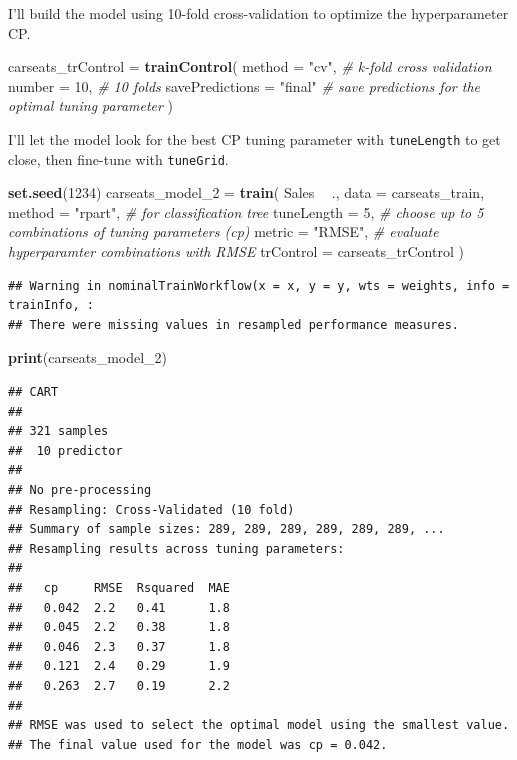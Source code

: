 \documentclass[
]{book}
\newenvironment{Shaded}{\begin{snugshade}}{\end{snugshade}}
\newcommand{\CommentTok}[1]{\textcolor[rgb]{0.56,0.35,0.01}{\textit{#1}}}
\newcommand{\DataTypeTok}[1]{\textcolor[rgb]{0.13,0.29,0.53}{#1}}
\newcommand{\DecValTok}[1]{\textcolor[rgb]{0.00,0.00,0.81}{#1}}
\newcommand{\KeywordTok}[1]{\textcolor[rgb]{0.13,0.29,0.53}{\textbf{#1}}}
\newcommand{\NormalTok}[1]{#1}
\newcommand{\OperatorTok}[1]{\textcolor[rgb]{0.81,0.36,0.00}{\textbf{#1}}}
\newcommand{\StringTok}[1]{\textcolor[rgb]{0.31,0.60,0.02}{#1}}
\begin{document}
I'll build the model using 10-fold cross-validation to optimize the hyperparameter CP.

\begin{Shaded}
\begin{Highlighting}[]
\NormalTok{carseats_trControl =}\StringTok{ }\KeywordTok{trainControl}\NormalTok{(}
   \DataTypeTok{method =} \StringTok{"cv"}\NormalTok{,  }\CommentTok{# k-fold cross validation}
   \DataTypeTok{number =} \DecValTok{10}\NormalTok{,  }\CommentTok{# 10 folds}
   \DataTypeTok{savePredictions =} \StringTok{"final"}       \CommentTok{# save predictions for the optimal tuning parameter}
\NormalTok{)}
\end{Highlighting}
\end{Shaded}

I'll let the model look for the best CP tuning parameter with \texttt{tuneLength} to get close, then fine-tune with \texttt{tuneGrid}.

\begin{Shaded}
\begin{Highlighting}[]
\KeywordTok{set.seed}\NormalTok{(}\DecValTok{1234}\NormalTok{)}
\NormalTok{carseats_model_}\DecValTok{2}\NormalTok{ =}\StringTok{ }\KeywordTok{train}\NormalTok{(}
\NormalTok{   Sales }\OperatorTok{~}\StringTok{ }\NormalTok{., }
   \DataTypeTok{data =}\NormalTok{ carseats_train, }
   \DataTypeTok{method =} \StringTok{"rpart"}\NormalTok{,  }\CommentTok{# for classification tree}
   \DataTypeTok{tuneLength =} \DecValTok{5}\NormalTok{,  }\CommentTok{# choose up to 5 combinations of tuning parameters (cp)}
   \DataTypeTok{metric =} \StringTok{"RMSE"}\NormalTok{,  }\CommentTok{# evaluate hyperparamter combinations with RMSE}
   \DataTypeTok{trControl =}\NormalTok{ carseats_trControl}
\NormalTok{)}
\end{Highlighting}
\end{Shaded}

\begin{verbatim}
## Warning in nominalTrainWorkflow(x = x, y = y, wts = weights, info = trainInfo, :
## There were missing values in resampled performance measures.
\end{verbatim}

\begin{Shaded}
\begin{Highlighting}[]
\KeywordTok{print}\NormalTok{(carseats_model_}\DecValTok{2}\NormalTok{)}
\end{Highlighting}
\end{Shaded}

\begin{verbatim}
## CART 
## 
## 321 samples
##  10 predictor
## 
## No pre-processing
## Resampling: Cross-Validated (10 fold) 
## Summary of sample sizes: 289, 289, 289, 289, 289, 289, ... 
## Resampling results across tuning parameters:
## 
##   cp     RMSE  Rsquared  MAE
##   0.042  2.2   0.41      1.8
##   0.045  2.2   0.38      1.8
##   0.046  2.3   0.37      1.8
##   0.121  2.4   0.29      1.9
##   0.263  2.7   0.19      2.2
## 
## RMSE was used to select the optimal model using the smallest value.
## The final value used for the model was cp = 0.042.
\end{verbatim}
\end{document}
